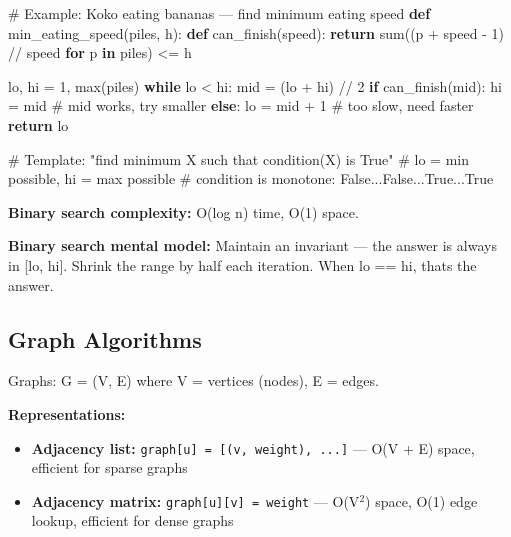 \documentclass[11pt]{article}
\providecommand{\tightlist}{\setlength{\itemsep}{1pt}\setlength{\parskip}{0pt}}
\newenvironment{Shaded}{\begin{snugshade}}{\end{snugshade}}
\newcommand{\BuiltInTok}[1]{\textcolor[rgb]{0.50,0.55,0.55}{#1}}
\newcommand{\CommentTok}[1]{\textcolor[rgb]{0.48,0.49,0.49}{#1}}
\newcommand{\ControlFlowTok}[1]{\textcolor[rgb]{0.99,0.74,0.29}{\textbf{#1}}}
\newcommand{\DecValTok}[1]{\textcolor[rgb]{0.96,0.45,0.00}{#1}}
\newcommand{\KeywordTok}[1]{\textcolor[rgb]{0.81,0.81,0.76}{\textbf{#1}}}
\newcommand{\NormalTok}[1]{\textcolor[rgb]{0.81,0.81,0.76}{#1}}
\newcommand{\OperatorTok}[1]{\textcolor[rgb]{0.81,0.81,0.76}{#1}}
\begin{document}
\begin{Shaded}
\begin{Highlighting}[]
\CommentTok{\# Example: Koko eating bananas — find minimum eating speed}
\KeywordTok{def}\NormalTok{ min\_eating\_speed(piles, h):}
    \KeywordTok{def}\NormalTok{ can\_finish(speed):}
        \ControlFlowTok{return} \BuiltInTok{sum}\NormalTok{((p }\OperatorTok{+}\NormalTok{ speed }\OperatorTok{{-}} \DecValTok{1}\NormalTok{) }\OperatorTok{//}\NormalTok{ speed }\ControlFlowTok{for}\NormalTok{ p }\KeywordTok{in}\NormalTok{ piles) }\OperatorTok{\textless{}=}\NormalTok{ h}

\NormalTok{    lo, hi }\OperatorTok{=} \DecValTok{1}\NormalTok{, }\BuiltInTok{max}\NormalTok{(piles)}
    \ControlFlowTok{while}\NormalTok{ lo }\OperatorTok{\textless{}}\NormalTok{ hi:}
\NormalTok{        mid }\OperatorTok{=}\NormalTok{ (lo }\OperatorTok{+}\NormalTok{ hi) }\OperatorTok{//} \DecValTok{2}
        \ControlFlowTok{if}\NormalTok{ can\_finish(mid):}
\NormalTok{            hi }\OperatorTok{=}\NormalTok{ mid        }\CommentTok{\# mid works, try smaller}
        \ControlFlowTok{else}\NormalTok{:}
\NormalTok{            lo }\OperatorTok{=}\NormalTok{ mid }\OperatorTok{+} \DecValTok{1}    \CommentTok{\# too slow, need faster}
    \ControlFlowTok{return}\NormalTok{ lo}

\CommentTok{\# Template: "find minimum X such that condition(X) is True"}
\CommentTok{\# lo = min possible, hi = max possible}
\CommentTok{\# condition is monotone: False...False...True...True}
\end{Highlighting}
\end{Shaded}

\textbf{Binary search complexity:} O(log n) time, O(1) space.

\textbf{Binary search mental model:} Maintain an invariant --- the answer is always in {[}lo, hi{]}. Shrink the range by half each iteration. When lo == hi, that\textquotesingle s the answer.

\subsection{Graph Algorithms}\label{graph-algorithms}

Graphs: G = (V, E) where V = vertices (nodes), E = edges.

\textbf{Representations:}

\begin{itemize}
\tightlist
\item
  \textbf{Adjacency list:} \texttt{graph{[}u{]}\ =\ {[}(v,\ weight),\ ...{]}} --- O(V + E) space, efficient for sparse graphs
\item
  \textbf{Adjacency matrix:} \texttt{graph{[}u{]}{[}v{]}\ =\ weight} --- O(V\(^2\)) space, O(1) edge lookup, efficient for dense graphs
\end{itemize}
\end{document}
